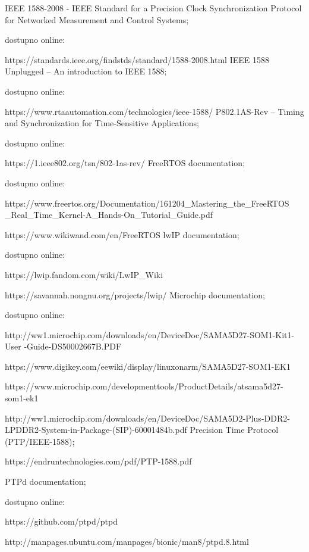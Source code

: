 \documentclass[a4paper,12pt, master]{etf}
\begin{document}
    \begin{thebibliography}{10}
         IEEE 1588-2008 - IEEE Standard for a Precision Clock
        Synchronization Protocol for Networked Measurement and Control Systems;

        dostupno online:

        https://standards.ieee.org/findstds/standard/1588-2008.html
         IEEE 1588 Unplugged – An introduction to IEEE 1588;

        dostupno online:

        https://www.rtaautomation.com/technologies/ieee-1588/
         P802.1AS-Rev – Timing and Synchronization for
        Time-Sensitive Applications;

        dostupno online:

        https://1.ieee802.org/tsn/802-1as-rev/
         FreeRTOS documentation;

        dostupno online:

        https://www.freertos.org/Documentation/161204\_Mastering\_the\_FreeRTOS
        \_Real\_Time\_Kernel-A\_Hands-On\_Tutorial\_Guide.pdf

        https://www.wikiwand.com/en/FreeRTOS
         lwIP documentation;

        dostupno online:

        https://lwip.fandom.com/wiki/LwIP\_Wiki

        https://savannah.nongnu.org/projects/lwip/
         Microchip documentation;

        dostupno online:

        http://ww1.microchip.com/downloads/en/DeviceDoc/SAMA5D27-SOM1-Kit1-User
        -Guide-DS50002667B.PDF

        https://www.digikey.com/eewiki/display/linuxonarm/SAMA5D27-SOM1-EK1

        https://www.microchip.com/developmenttools/ProductDetails/atsama5d27-
        som1-ek1

        http://ww1.microchip.com/downloads/en/DeviceDoc/SAMA5D2-Plus-DDR2-
        LPDDR2-System-in-Package-(SIP)-60001484b.pdf
         Precision Time Protocol (PTP/IEEE-1588);

        https://endruntechnologies.com/pdf/PTP-1588.pdf

         PTPd documentation;

        dostupno online:

        https://github.com/ptpd/ptpd

        http://manpages.ubuntu.com/manpages/bionic/man8/ptpd.8.html
    \end{thebibliography}
\end{document}
